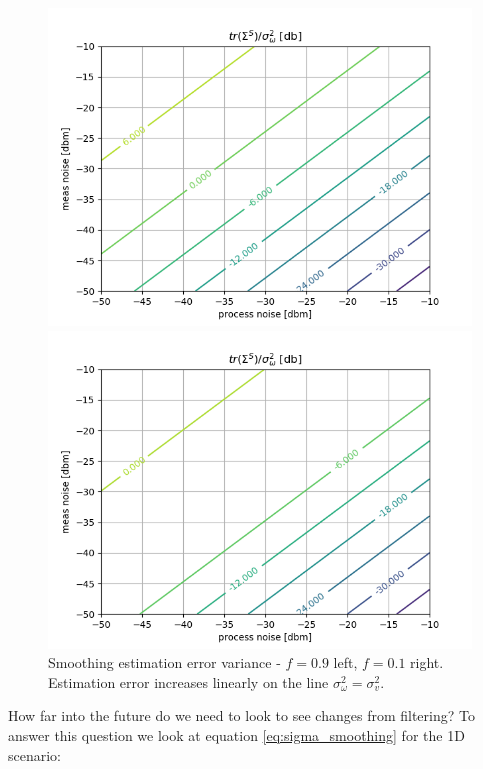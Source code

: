\documentclass[oneside,12pt]{article}
\begin{document}
\begin{figure}[!tbp]
\begin{minipage}[b]{0.45\textwidth}
    \includegraphics[width=\textwidth]{./fig_1d_smoothing_f09_wrt_noiseVar}
  \end{minipage}
  \begin{minipage}[b]{0.45\textwidth}
    \includegraphics[width=\textwidth]{./fig_1d_smoothing_f01_wrt_noiseVar}
  \end{minipage}
  \caption{\label{fig:fig_1d_smoothing}Smoothing estimation error variance - $f=0.9$ left, $f=0.1$ right. Estimation error increases linearly on the line $\sigma_\omega^2=\sigma_v^2$.}
\end{figure}
%
How far into the future do we need to look to see changes from filtering? To answer this question we look at equation \ref{eq:sigma_smoothing} for the 1D scenario:
\end{document}
